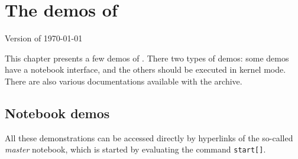 \chapter{The demos of {\mmalfa}}
\label{demos}

{\sc Version of \today{}}

This chapter presents a few demos of
{\mmalfa}. 
There two types of demos: some demos
have a notebook interface, and the others
should be executed in kernel mode. There are also various
documentations available with the \alfa{} archive.

\section{Notebook demos}
All these demonstrations can be accessed directly by 
hyperlinks of the 
so-called {\em master} notebook, which is started by
evaluating the command \texttt{start[]}.

